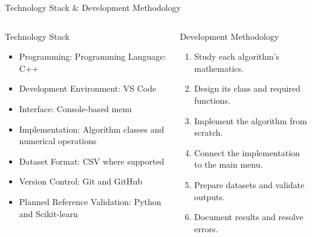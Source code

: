 \documentclass[aspectratio=169,11pt]{beamer}
\begin{document}
\begin{frame}[shrink=15]{Technology Stack \& Development Methodology}
\begin{columns}[T,totalwidth=\textwidth]
\begin{block}{Technology Stack}
\footnotesize
\begin{itemize}\itemsep2pt
\item Programming: Programming Language: C++
\item Development Environment: VS Code
\item Interface: Console-based menu
\item Implementation: Algorithm classes and numerical operations
\item Dataset Format: CSV where supported
\item Version Control: Git and GitHub
\item Planned Reference Validation: Python and Scikit-learn
\end{itemize}
\end{block}

\begin{block}{Development Methodology}
\begin{enumerate}\itemsep2pt
\item Study each algorithm’s mathematics.
\item Design its class and required functions.
\item Implement the algorithm from scratch.
\item Connect the implementation to the main menu.
\item Prepare datasets and validate outputs.
\item Document results and resolve errors.
\end{enumerate}
\end{block}
\end{columns}


\end{frame}
\end{document}
